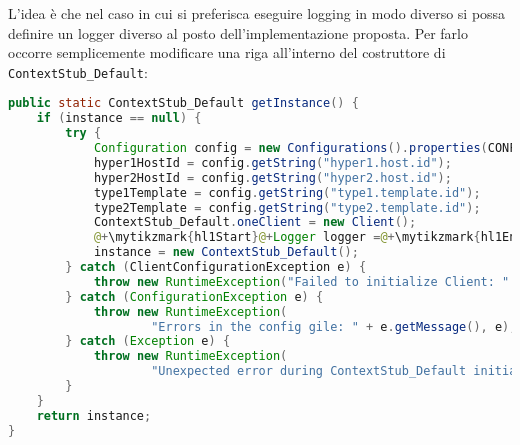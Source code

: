 L'idea è che nel caso in cui si preferisca eseguire logging in modo diverso si possa definire un logger diverso al posto dell'implementazione proposta. Per farlo occorre semplicemente modificare una riga all'interno del costruttore di \texttt{ContextStub\_Default}:
\begin{lstlisting}[language=Java, caption=Costruttore ContextStub\_Default, label=code:CostContextStub]
public static ContextStub_Default getInstance() {
    if (instance == null) {
        try {
            Configuration config = new Configurations().properties(CONFIG_FILE);
            hyper1HostId = config.getString("hyper1.host.id");
            hyper2HostId = config.getString("hyper2.host.id");
            type1Template = config.getString("type1.template.id");
            type2Template = config.getString("type2.template.id");
            ContextStub_Default.oneClient = new Client();
            @+\mytikzmark{hl1Start}@+Logger logger =@+\mytikzmark{hl1End}@+ @+\mytikzmark{hl2Start}@+FileLoggerFactory.make("logs/virtualMachines.log");@+\mytikzmark{hl2End}@+				inizializeStub(oneClient, logger);
            instance = new ContextStub_Default();
        } catch (ClientConfigurationException e) {
            throw new RuntimeException("Failed to initialize Client: " + e.getMessage(), e);
        } catch (ConfigurationException e) {
            throw new RuntimeException(
                    "Errors in the config gile: " + e.getMessage(), e);
        } catch (Exception e) {
            throw new RuntimeException(
                    "Unexpected error during ContextStub_Default initialization: " + e.getMessage(), e);
        }
    }
    return instance;
}

\end{lstlisting}
